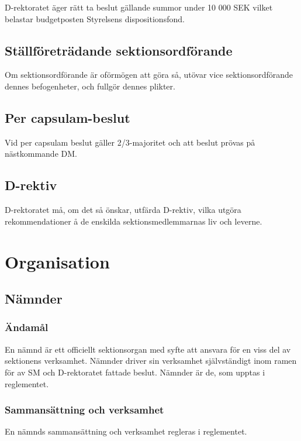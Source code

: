 \documentclass{dgovdoc}
\begin{document}
D-rektoratet äger rätt ta beslut gällande summor under 10 000 SEK vilket belastar budgetposten Styrelsens dispositionsfond.

\subsection{Ställföreträdande sektionsordförande}

Om sektionsordförande är oförmögen att göra så, utövar vice sektionsordförande
dennes befogenheter, och fullgör dennes plikter.

\subsection{Per capsulam-beslut}

Vid per capsulam beslut gäller 2/3-majoritet och att beslut prövas på
nästkommande DM.

\subsection{D-rektiv}

D-rektoratet må, om det så önskar, utfärda D-rektiv, vilka utgöra
rekommendationer å de enskilda sektionsmedlemmarnas liv och leverne.

\section{Organisation}

\subsection{Nämnder}
\label{sec:namnder}

\subsubsection{Ändamål}

En nämnd är ett officiellt sektionsorgan med syfte att ansvara för en viss del
av sektionens verksamhet. Nämnder driver sin verksamhet självständigt inom
ramen för av SM och D-rektoratet fattade beslut. Nämnder är de, som upptas i
reglementet.

\subsubsection{Sammansättning och verksamhet}

En nämnds sammansättning och verksamhet regleras i reglementet.
\end{document}

